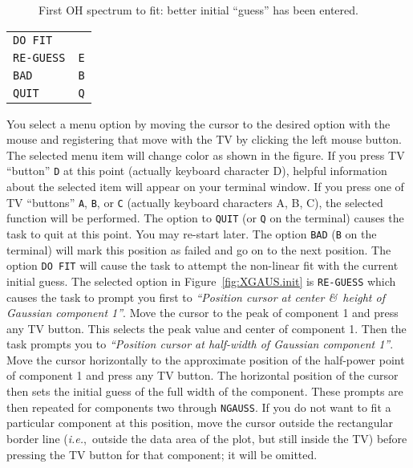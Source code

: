 \documentclass[twoside]{article}
\newcommand{\ie}{{\it i.e.},}
\newcommand{\putfig}[1]{\texttt{[image: \#1.eps]}}
\begin{document}
\begin{figure}
\begin{center}
\resizebox{6.0in}{!}{\putfig{XGAUS.guess}}
\caption{First OH spectrum to fit: better initial ``guess'' has been
  entered.}
\label{fig:XGAUS.guess}
\end{center}
\end{figure}

\begin{center}
\begin{tabular}{|l|l|}\hline
   {\tt DO FIT}   & {\tt \hphantom{A}} \\
   {\tt RE-GUESS} & {\tt E} \\
   {\tt BAD}      & {\tt B} \\
   {\tt QUIT}     & {\tt Q} \\ \hline
\end{tabular}
\end{center}
You select a menu option by moving the cursor to the desired option
with the mouse and registering that move with the TV by clicking the
left mouse button.  The selected menu item will change color as shown
in the figure.  If you press TV ``button'' {\tt D} at this point
(actually keyboard character D), helpful information about the
selected item will appear on your terminal window.  If you press one
of TV ``buttons'' {\tt A}, {\tt B}, or {\tt C} (actually keyboard
characters A, B, C), the selected function will be performed.  The
option to {\tt QUIT} (or {\tt Q} on the terminal) causes the task to
quit at this point.  You may re-start later.  The option {\tt BAD}
({\tt B} on the terminal) will mark this position as failed and go on
to the next position.  The option {\tt DO FIT} will cause the task to
attempt the non-linear fit with the current initial guess.  The
selected option in Figure~\ref{fig:XGAUS.init} is {\tt RE-GUESS} which
causes the task to prompt you first to {\it ``Position cursor at
  center \&\ height of Gaussian component 1''}.  Move the cursor to
the peak of component 1 and press any TV button.  This selects the
peak value and center of component 1.  Then the task prompts you to
{\it ``Position cursor at half-width of Gaussian component 1''}.  Move
the cursor horizontally to the approximate position of the half-power
point of component 1 and press any TV button.  The horizontal position
of the cursor then sets the initial guess of the full width of the
component.  These prompts are then repeated for components two through
{\tt NGAUSS}\@.  If you do not want to fit a particular component at
this position, move the cursor outside the rectangular border line
(\ie\ outside the data area of the plot, but still inside the TV)
before pressing the TV button for that component; it will be omitted.
\end{document}
